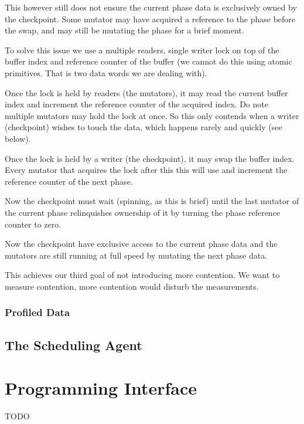 This however still does not ensure the current phase data is exclusively owned by the checkpoint. Some mutator may have acquired a reference to the phase before the swap, and may still be mutating the phase for a brief moment.

To solve this issue we use a multiple readers, single writer lock on top of the buffer index and reference counter of the buffer (we cannot do this using atomic primitives. That is two data words we are dealing with).

Once the lock is held by readers (the mutators), it may read the current buffer index and increment the reference counter of the acquired index. Do note multiple mutators may hold the lock at once. So this only contends when a writer (checkpoint) wishes to touch the data, which happens rarely and quickly (see below).

Once the lock is held by a writer (the checkpoint), it may swap the buffer index. Every mutator that acquires the lock after this this will use and increment the reference counter of the next phase.

Now the checkpoint must wait (spinning, as this is brief) until the last mutator of the current phase relinquishes ownership of it by turning the phase reference counter to zero.

Now the checkpoint have exclusive access to the current phase data and the mutators are still running at full speed by mutating the next phase data.

This achieves our third goal of not introducing more contention. We want to measure contention, more contention would disturb the measurements.

\subsubsection{Profiled Data} \label{sec:agentprof}


\subsection{The Scheduling Agent}


\section{Programming Interface} \label{sec:api}
\fi

TODO

